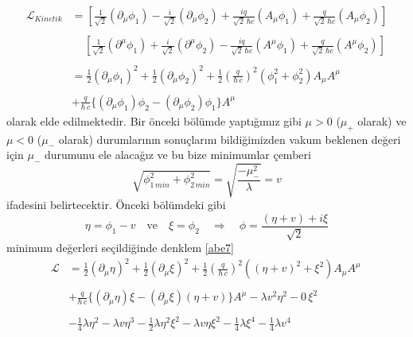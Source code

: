 \begin{equation} \label{abe4}
\begin{aligned}
\mathcal{L}_{Kinetik} &= \left[ \frac{1}{\sqrt{2}} \left( \partial_{\mu} \phi_{1} \right)
 - \frac{i}{\sqrt{2}} \left( \partial_{\mu} \phi_{2}  \right) + 
 \frac{i q}{\sqrt{2}\,\hbar c} \left( A_{\mu} \phi_{1} \right) +
 \frac{q }{\sqrt{2}\,\hbar c} \left( A_{\mu} \phi_{2} \right) \right] \\
 \\
 &\quad\, \left[ \frac{1}{\sqrt{2}} \left( \partial^{\mu} \phi_{1} \right)
 + \frac{i}{\sqrt{2}} \left( \partial^{\mu} \phi_{2}  \right) - 
 \frac{i q}{\sqrt{2}\,\hbar c} \left( A^{\mu} \phi_{1} \right) +
 \frac{q }{\sqrt{2}\,\hbar c} \left( A^{\mu} \phi_{2} \right) \right] \\
 \\
 &= \frac{1}{2} \left( \partial_{\mu} \phi_{1} \right)^{2} +
 \frac{1}{2} \left( \partial_{\mu} \phi_{2} \right)^{2} + 
 \frac{1}{2} \left(\frac{q}{\hbar \, c} \right)^{2} \left( \phi_{1}^{2} + \phi_{2}^{2} \right) A_{\mu} A^{\mu}\, \\
 \\
 & + \frac{q}{\hbar \, c} \bigg\lbrace  \left( \partial_{\mu}\phi_{1} \right)\phi_{2} - \left( \partial_{\mu}\phi_{2} \right) \phi_{1} \bigg\rbrace A^{\mu}
\end{aligned}
\end{equation}
olarak elde edilmektedir. Bir önceki bölümde yaptığımız gibi $\mu > 0$ ($\mu_{+}$ olarak) ve $\mu < 0$ ($\mu_{-}$ olarak) durumlarının sonuçlarını bildiğimizden vakum beklenen değeri için  $\mu_{-}$ durumunu ele alacağız ve bu bize minimumlar çemberi $$\sqrt{ \phi_{1 \,min}^{2} + \phi_{2 \,min}^{2} }  = \sqrt{ \frac{- \mu_{-}^{2}}{\lambda} } = v $$
ifadesini belirtecektir. Önceki bölümdeki gibi 
$$
\eta = \phi_{1} - v \quad \textrm{ve} \quad \xi = \phi_{2} \quad \Rightarrow \quad \phi = \frac{ ( \eta + v ) + i \xi }{\sqrt{2}}
$$ 
minimum değerleri seçildiğinde denklem \eqref{abe7}
\begin{equation*}
\begin{aligned}
\mathcal{L} &= \frac{1}{2} \left( \partial_{\mu} \eta \right)^{2} +
 \frac{1}{2} \left( \partial_{\mu} \xi \right)^{2} + 
 \frac{1}{2} \left(\frac{q}{\hbar \, c} \right)^{2} \left( (\eta + v)^{2} + \xi^{2} \right) A_{\mu} A^{\mu}\, \\
 \\
 & + \frac{q}{\hbar \, c} \bigg\lbrace  \left( \partial_{\mu} \eta  \right)\xi - \left( \partial_{\mu}\xi \right) (\eta + v) \bigg\rbrace A^{\mu}  - \lambda v^{2} \eta^{2} - 0\, \xi^{2} \\
 \\
& - \frac{1}{4} \lambda \eta^{2} -  \lambda v \eta^{3} - \frac{1}{2} \lambda \eta^{2} \xi^{2} - \lambda v \eta \xi^{2} - \frac{1}{4} \lambda \xi^{4}  - \frac{1}{4} \lambda v^{4}
 \end{aligned}
\end{equation*}
